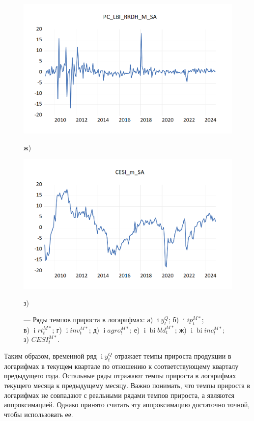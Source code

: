\documentclass[a4paper, 14pt]{extreport}
\numberwithin{equation}{section}
\renewcommand{\i}{\operatorname{i}}
\newcommand{\bi}{\operatorname{bi}}
\numberwithin{equation}{section}
\begin{document}
\begin{figure}[h!]
		\begin{minipage}{0.5\textwidth}
			\centering
			\includegraphics[scale=0.4]{images/image28}
			\caption*{ж)}
		\end{minipage}%
		\hfill %
		\begin{minipage}{0.5\textwidth}
			\centering
			\includegraphics[scale=0.4]{images/image14}
			\caption*{з)}
		\end{minipage}
		
		\caption{\centering --- Ряды темпов прироста в логарифмах: а) $\i y_t^Q$; б) $\i ip_t^{M*}$;\\ в) $\i rt_t^{M*}$; г) $\i inv_t^{M*}$; д) $\i agro_t^{M*}$; е) $\i \bi bld_t^{M*}$; ж) $\i \bi inc_t^{M*}$; з) $CESI^{M*}_t$.}
		\label{fig:ts-3}
	\end{figure}
	
	Таким образом, временной ряд $\i y_t^Q$ отражает темпы прироста продукции в логарифмах в текущем квартале по отношению к соответствующему кварталу предыдущего года. Остальные ряды отражают темпы прироста в логарифмах текущего месяца к предыдущему месяцу. Важно понимать, что темпы прироста в логарифмах не совпадают с реальными рядами темпов прироста, а являются аппроксимацией. Однако принято считать эту аппроксимацию достаточно точной, чтобы использовать ее.
	
\end{document}
